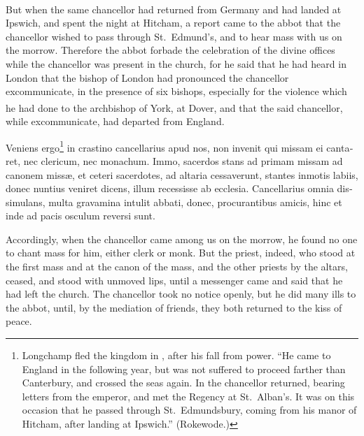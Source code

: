 \documentclass{book}
\newcounter{engnote}
\newcommand{\engnotenum}{\textsuperscript{\arabic{engnote}\stepcounter{engnote}}}
\begin{document}
\begin{paracol}{2}
\begin{otherlanguage}{latin}
\end{otherlanguage}

\switchcolumn

But when the same chancellor had returned from Germany\engnotenum{} and had landed at Ipswich, and spent the night at Hitcham, a report came to the abbot that the chancellor wished to pass through St.\ Edmund's, and to hear mass with us on the morrow. Therefore the abbot forbade the celebration of the divine offices while the chancellor was present in the church, for he said that he had heard in London that the bishop of London had pronounced the chancellor excommunicate, in the presence of six bishops, especially for the violence which he had done to the archbishop of York,\engnotenum{} at Dover, and that the said chancellor, while excommunicate, had departed from England.

\switchcolumn*

\begin{otherlanguage}{latin}
Veniens ergo\footnote[\ddag]{Longchamp fled the kingdom in , after his fall from power. ``He came to England in the following year, but was not suffered to proceed farther than Canterbury, and crossed the seas again. In  the chancellor returned, bearing letters from the emperor, and met the Regency at St.\ Alban's. It was on this occasion that he passed through St.\ Edmundsbury, coming from his manor of Hitcham, after landing at Ipswich.'' (Rokewode.)} in crastino cancellarius apud nos, non invenit qui missam ei cantaret, nec clericum, nec monachum. Immo, sacerdos stans ad primam missam ad canonem miss\ae{}, et ceteri sacerdotes, ad altaria cessaverunt, stantes inmotis labiis, donec nuntius veniret dicens, illum recessisse ab ecclesia. Cancellarius omnia dissimulans, multa gravamina intulit abbati, donec, procurantibus amicis, hinc et inde ad pacis osculum reversi sunt.
\end{otherlanguage}

\switchcolumn

Accordingly, when the chancellor came among us on the morrow, he found no one to chant mass for him, either clerk or monk. But the priest, indeed, who stood at the first mass and at the canon of the mass, and the other priests by the altars, ceased, and stood with unmoved lips, until a messenger came and said that he had left the church. The chancellor took no notice openly, but he did many ills to the abbot, until, by the mediation of friends, they both returned to the kiss of peace.


\end{paracol}
\end{document}
